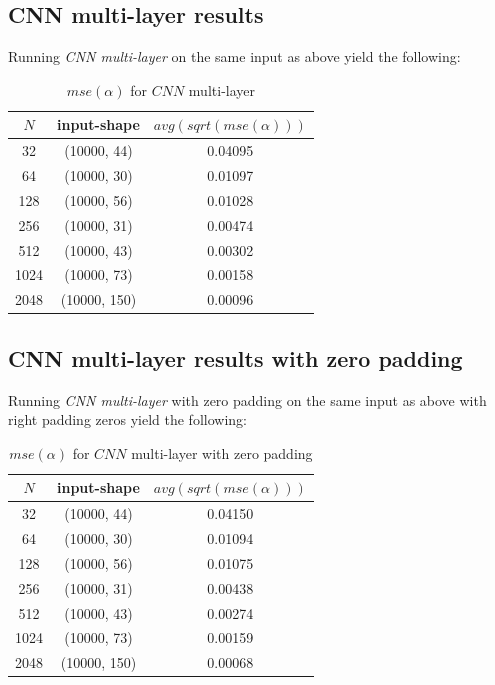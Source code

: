 \documentclass[a4paper, 12pt]{report}
\begin{document}
\subsection{CNN multi-layer results}
\par Running \textit{CNN multi-layer} on the same input as above yield the following:
\begin{table}[h!]
    \centering
    \begin{tabular}{||c c c||} 
        \hline
        $N$ & input-shape & $avg(sqrt(mse(\alpha)))$ \\ [0.5ex] 
        \hline\hline
        32 & (10000, 44) & 0.04095 \\ 
        \hline
        64 & (10000, 30) & 0.01097 \\
        \hline
        128 & (10000, 56) & 0.01028 \\
        \hline
        256 & (10000, 31) & 0.00474 \\
        \hline
        512 & (10000, 43) & 0.00302 \\ 
        \hline
        1024 & (10000, 73) & 0.00158 \\ 
        \hline
        2048 & (10000, 150) & 0.00096 \\ 
        \hline
    \end{tabular}
    \caption{$mse(\alpha)$ for $CNN$ multi-layer}
    \label{table:5}
\end{table}

\subsection{CNN multi-layer results with zero padding}
\par Running \textit{CNN multi-layer} with zero padding on the same input as above with right padding zeros yield the following:
\begin{table}[h!]
    \centering
    \begin{tabular}{||c c c||} 
        \hline
        $N$ & input-shape & $avg(sqrt(mse(\alpha)))$ \\ [0.5ex] 
        \hline\hline
        32 & (10000, 44) & 0.04150 \\ 
        \hline
        64 & (10000, 30) & 0.01094 \\
        \hline
        128 & (10000, 56) & 0.01075 \\
        \hline
        256 & (10000, 31) & 0.00438 \\
        \hline
        512 & (10000, 43) & 0.00274 \\ 
        \hline
        1024 & (10000, 73) & 0.00159 \\ 
        \hline
        2048 & (10000, 150) & 0.00068 \\ 
        \hline
    \end{tabular}
    \caption{$mse(\alpha)$ for $CNN$ multi-layer with zero padding}
    \label{table:6}
\end{table}
\end{document}
